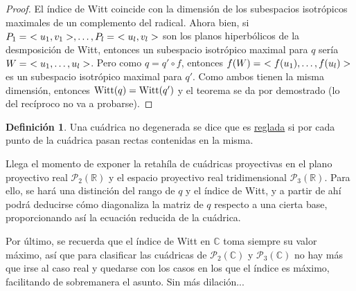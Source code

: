 \documentclass[12pt]{report}
\theoremstyle{definition}
\newtheorem{definition}{Definición}[chapter]
\theoremstyle{definition}
\theoremstyle{remark}
\newcommand{\R}{\mathbb R}
\begin{document}
\begin{proof}
\vspace{2mm}
El índice de Witt coincide con la dimensión de los subespacios isotrópicos maximales de un complemento del radical. Ahora bien, si $P_1 = \ <u_1,v_1>, \mathellipsis, P_l = \ <u_l,v_l>$ son los planos hiperbólicos de la desmposición de Witt, entonces un subespacio isotrópico maximal para $q$ sería $W = \ <u_1,\mathellipsis,u_l>$. Pero como $q = q' \circ f$, entonces $f(W) = \ <f(u_1),\mathellipsis,f(u_l)>$ es un subespacio isotrópico maximal para $q'$. Como ambos tienen la misma dimensión, entonces $\textup{Witt}(q) = \textup{Witt}(q')$ y el teorema se da por demostrado (lo del recíproco no va a probarse).
\end{proof}

\begin{definition}
Una cuádrica no degenerada se dice que es \ul{reglada} si por cada punto de la cuádrica pasan rectas contenidas en la misma.
\end{definition}

Llega el momento de exponer la retahíla de cuádricas proyectivas en el plano proyectivo real $\mathcal{P}_2(\R)$ y el espacio proyectivo real tridimensional $\mathcal{P}_3(\R)$. Para ello, se hará una distinción del rango de $q$ y el índice de Witt, y a partir de ahí podrá deducirse cómo diagonaliza la matriz de $q$ respecto a una cierta base, proporcionando así la ecuación reducida de la cuádrica.

\vspace{2mm}
Por último, se recuerda que el índice de Witt en $\mathbb{C}$ toma siempre su valor máximo, así que para clasificar las cuádricas de $\mathcal{P}_2(\mathbb{C})$ y $\mathcal{P}_3(\mathbb{C})$ no hay más que irse al caso real y quedarse con los casos en los que el índice es máximo, facilitando de sobremanera el asunto. Sin más dilación...

\pagebreak

\thispagestyle{empty}

\vspace*{12mm}
\end{document}
